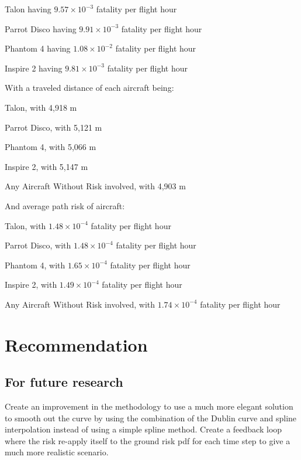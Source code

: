 \documentclass[12pt]{report}
\begin{document}
    \begin{myitemize}
        \item Talon having $9.57 \times 10^{-3}$ fatality per flight hour
        \item Parrot Disco having $9.91 \times 10^{-3}$ fatality per flight hour
        \item Phantom 4 having $1.08 \times 10^{-2}$ fatality per flight hour
        \item Inspire 2 having $9.81 \times 10^{-3}$ fatality per flight hour
    \end{myitemize}
    With a traveled distance of each aircraft being:
    \begin{myitemize}
        \item Talon, with 4,918 m
        \item Parrot Disco, with 5,121 m
        \item Phantom 4, with 5,066 m
        \item Inspire 2, with 5,147 m
        \item Any Aircraft Without Risk involved, with 4,903 m
    \end{myitemize}
    And average path risk of aircraft:
    \begin{myitemize}
        \item Talon, with $1.48 \times 10^{-4}$ fatality per flight hour
        \item Parrot Disco, with $1.48 \times 10^{-4}$ fatality per flight hour
        \item Phantom 4, with $1.65 \times 10^{-4}$ fatality per flight hour
        \item Inspire 2, with $1.49 \times 10^{-4}$ fatality per flight hour
        \item Any Aircraft Without Risk involved, with $1.74 \times 10^{-4}$ fatality per flight hour
    \end{myitemize}

    \section{Recommendation}
        \subsection{For future research}
        Create an improvement in the methodology to use a much more elegant solution to smooth out the curve by using
        the combination of the Dublin curve and spline interpolation instead of using a simple spline method. Create a
        feedback loop where the risk re-apply itself to the ground risk pdf for each time step to give a much more
        realistic scenario.
        
\end{document}
